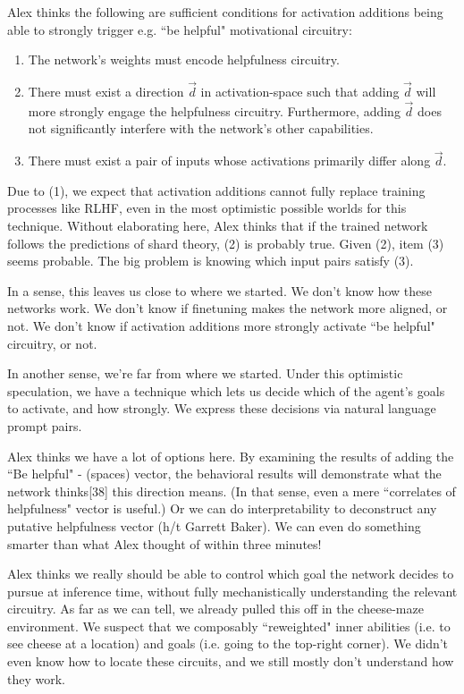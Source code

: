\documentclass[10pt]{article}
\begin{document}
Alex thinks the following are sufficient conditions for activation additions being able to strongly trigger e.g. ``be helpful" motivational circuitry:

\begin{enumerate}
\item The network's weights must encode helpfulness circuitry.

\item There must exist a direction $\vec{d}$ in activation-space such that adding $\vec{d}$ will more strongly engage the helpfulness circuitry. Furthermore, adding $\vec{d}$ does not significantly interfere with the network's other capabilities.

\item There must exist a pair of inputs whose activations primarily differ along $\vec{d}$.
\end{enumerate}

Due to (1), we expect that activation additions cannot fully replace training processes like RLHF, even in the most optimistic possible worlds for this technique. Without elaborating here, Alex thinks that if the trained network follows the predictions of shard theory, (2) is probably true. Given (2), item (3) seems probable. The big problem is knowing which input pairs satisfy (3). 

In a sense, this leaves us close to where we started. We don't know how these networks work. We don't know if finetuning makes the network more aligned, or not. We don't know if activation additions more strongly activate ``be helpful" circuitry, or not.

In another sense, we're far from where we started. Under this optimistic speculation, we have a technique which lets us decide which of the agent's goals to activate, and how strongly. We express these decisions via natural language prompt pairs. 

Alex thinks we have a lot of options here. By examining the results of adding the ``Be helpful" - (spaces) vector, the behavioral results will demonstrate what the network thinks[38] this direction means. (In that sense, even a mere ``correlates of helpfulness" vector is useful.) Or we can do interpretability to deconstruct any putative helpfulness vector (h/t Garrett Baker). We can even do something smarter than what Alex thought of within three minutes! 

Alex thinks we really should be able to control which goal the network decides to pursue at inference time, without fully mechanistically understanding the relevant circuitry. As far as we can tell, we already pulled this off in the cheese-maze environment. We suspect that we composably ``reweighted" inner abilities (i.e. to see cheese at a location) and goals (i.e. going to the top-right corner). We didn't even know how to locate these circuits, and we still mostly don't understand how they work. 
\end{document}
